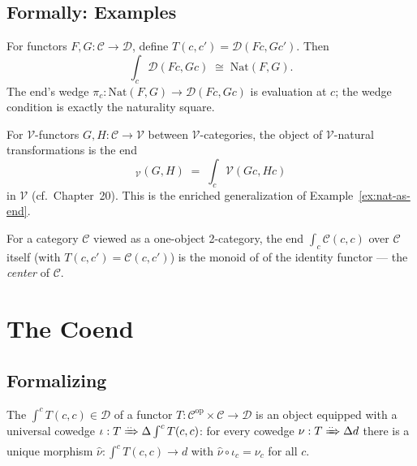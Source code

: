 \subsection{Formally: Examples}

\begin{example_thm}
\label{ex:nat-as-end}
For functors $F, G : \mathcal{C} \to \mathcal{D}$, define
$T(c, c') = \mathcal{D}(F c, G c')$. Then
\begin{equation*}
  \int_c \mathcal{D}(Fc, Gc) \;\cong\; \mathrm{Nat}(F, G).
\end{equation*}
The end's wedge $\pi_c : \mathrm{Nat}(F, G) \to \mathcal{D}(Fc, Gc)$ is
evaluation at $c$; the wedge condition is exactly the naturality square.
\end{example_thm}

\begin{example_thm}
For $\mathcal{V}$-functors $G, H : \mathcal{C} \to \mathcal{V}$ between
$\mathcal{V}$-categories, the object of $\mathcal{V}$-natural transformations
is the end
\begin{equation*}
  [\mathcal{C}, \mathcal{V}]_\mathcal{V}(G, H) \;=\; \int_c \mathcal{V}(G c, H c)
\end{equation*}
in $\mathcal{V}$ (cf.\ Chapter~20). This is the enriched generalization of
Example~\ref{ex:nat-as-end}.
\end{example_thm}

\begin{example_thm}
For a category $\mathcal{C}$ viewed as a one-object 2-category, the end
$\int_c \mathcal{C}(c, c)$ over $\mathcal{C}$ itself (with $T(c, c') =
\mathcal{C}(c, c')$) is the monoid of  of the
identity functor — the \emph{center} of $\mathcal{C}$.
\end{example_thm}


\section{The Coend}
\label{sec:coend}

\subsection{Formalizing}

\begin{definition}[Coend]
\label{def:coend}
The  $\int^c T(c, c) \in \mathcal{D}$ of a functor $T :
\mathcal{C}^{\mathrm{op}} \times \mathcal{C} \to \mathcal{D}$ is an object
equipped with a universal cowedge $\iota : T \xRightarrow{..} \Delta \int^c
T(c, c)$: for every cowedge $\nu : T \xRightarrow{..} \Delta d$ there is a
unique morphism $\hat\nu : \int^c T(c,c) \to d$ with $\hat\nu \circ \iota_c
= \nu_c$ for all $c$.
\end{definition}


